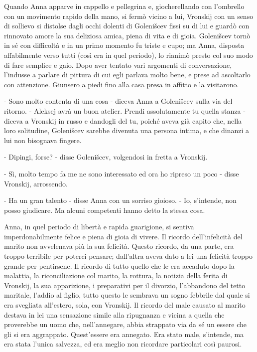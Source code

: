 Quando Anna apparve in cappello e pellegrina e, giocherellando con l'ombrello con un movimento rapido della mano, si fermò vicino a lui, Vronskij con un senso di sollievo si distolse dagli occhi dolenti di Golenišcev fissi su di lui e guardò con rinnovato amore la sua deliziosa amica, piena di vita e di gioia. Golenišcev tornò in sé con difficoltà e in un primo momento fu triste e cupo; ma Anna, disposta affabilmente verso tutti (così era in quel periodo), lo rianimò presto col suo modo di fare semplice e gaio. Dopo aver tentato vari argomenti di conversazione, l'indusse a parlare di pittura di cui egli parlava molto bene, e prese ad ascoltarlo con attenzione. Giunsero a piedi fino alla casa presa in affitto e la visitarono. 

- Sono molto contenta di una cosa - diceva Anna a Golenišcev sulla via del ritorno. - Aleksej avrà un buon atelier. Prendi assolutamente tu quella stanza - diceva a Vronskij in russo e dandogli del tu, poiché aveva già capito che, nella loro solitudine, Golenišcev sarebbe divenuta una persona intima, e che dinanzi a lui non bisognava fingere. 

- Dipingi, forse? - disse Golenišcev, volgendosi in fretta a Vronskij. 

- Sì, molto tempo fa me ne sono interessato ed ora ho ripreso un poco - disse Vronskij, arrossendo. 

- Ha un gran talento - disse Anna con un sorriso gioioso. - Io, s'intende, non posso giudicare. Ma alcuni competenti hanno detto la stessa cosa. 

\label{viii-4} 

Anna, in quel periodo di libertà e rapida guarigione, si sentiva imperdonabilmente felice e piena di gioia di vivere. Il ricordo dell'infelicità del marito non avvelenava più la sua felicità. Questo ricordo, da una parte, era troppo terribile per poterci pensare; dall'altra aveva dato a lei una felicità troppo grande per pentirsene. Il ricordo di tutto quello che le era accaduto dopo la malattia, la riconciliazione col marito, la rottura, la notizia della ferita di Vronskij, la sua apparizione, i preparativi per il divorzio, l'abbandono del tetto maritale, l'addio al figlio, tutto questo le sembrava un sogno febbrile dal quale si era svegliata all'estero, sola, con Vronskij. Il ricordo del male causato al marito destava in lei una sensazione simile alla ripugnanza e vicina a quella che proverebbe un uomo che, nell'annegare, abbia strappato via da sé un essere che gli si era aggrappato. Quest'essere era annegato. Era stato male, s'intende, ma era stata l'unica salvezza, ed era meglio non ricordare particolari così paurosi. 

